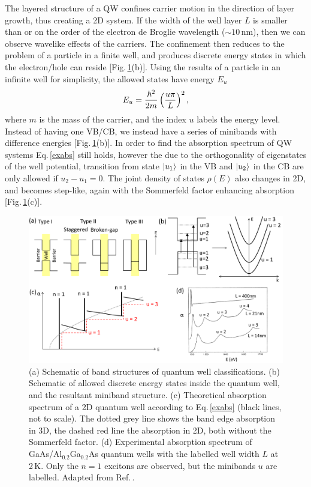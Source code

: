 The layered structure of a QW confines carrier motion in the direction of layer growth, thus creating a 2D system. If the width of the well layer $L$ is smaller than or on the order of the electron de Broglie wavelength ($\sim10$\,nm), then we can observe wavelike effects of the carriers. The confinement then reduces to the problem of a particle in a finite well, and produces discrete energy states in which the electron/hole can reside [Fig.\,\ref{2Fig2}(b)]. Using the results of a particle in an infinite well for simplicity, the allowed states have energy $E_u$
\begin{equation}
\centering
E_u = \frac{\hbar^2}{2m} \left(\frac{u\pi}{L}\right)^2 ,
\label{particleboxenergy}
\end{equation}
where $m$ is the mass of the carrier, and the index $u$ labels the energy level. Instead of having one VB/CB, we instead have a series of minibands with difference energies [Fig.\,\ref{2Fig2}(b)]. In order to find the absorption spectrum of QW systems Eq.\,\ref{exabs} still holds, however the due to the orthogonality of eigenstates of the well potential, transition from state $\Ket{u_1}$ in the VB and $\Ket{u_2}$ in the CB are only allowed if $u_2-u_1=0$. The joint density of states $\rho(E)$ also changes in 2D, and becomes step-like, again with the Sommerfeld factor enhancing absorption [Fig.\,\ref{2Fig2}(c)].
\begin{figure}[ht] 
\centering    
\includegraphics[width=\textwidth]{Fig2}
\caption{(a) Schematic of band structures of quantum well classifications. (b) Schematic of allowed discrete energy states inside the quantum well, and the resultant miniband structure. (c) Theoretical absorption spectrum of a 2D quantum well according to Eq.\,\ref{exabs} (black lines, not to scale). The dotted grey line shows the band edge absorption in 3D, the dashed red line the absorption in 2D, both without the Sommerfeld factor. (d) Experimental absorption spectrum of GaAs/Al$_{0.2}$Ga$_{0.2}$As quantum wells with the labelled well width $L$ at 2\,K. Only the $n=1$ excitons are observed, but the minibands $u$ are labelled. Adapted from Ref.\,\cite{Dingle1974}.}
\label{2Fig2}
\end{figure}


